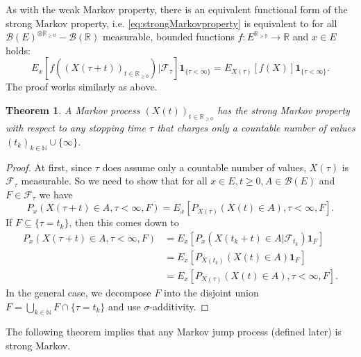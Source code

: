 \documentclass[12pt,a4paper]{scrartcl}
\newtheorem{theorem}{Theorem}[section]
\numberwithin{equation}{section}
\newcommand{\R}{\mathbb{R}} %
\newcommand{\N}{\mathbb{N}} %
\begin{document}
As with the weak Markov property, there is an equivalent functional form of the strong Markov property, i.e. \eqref{eq:strongMarkovproperty} is equivalent to for all $\mathcal{B}\left(E\right)^{\otimes \R_{\geq 0}}-\mathcal{B}\left(\R\right)$ measurable, bounded functions $f: E^{\R_{\geq 0}} \to \R$ and $x \in E$ holds:
\begin{equation}
E_x\left[f\left(\left(X\left(\tau + t\right)\right)_{t \in \R_{\geq 0}} \right) | \mathcal{F}_{\tau} \right] \textbf{1}_{\lbrace \tau < \infty \rbrace} = E_{X\left(\tau\right)}\left[f\left(X\right) \right] \textbf{1}_{\lbrace \tau < \infty \rbrace}.
\end{equation}
The proof works similarly as above.

\begin{theorem} \label{th:countablestoppingtime}
A Markov process $\left(X\left(t\right)\right)_{t \in \R_{\geq 0}}$ has the strong Markov property with respect to any stopping time $\tau$ that charges only a countable number of values $\left(t_k\right)_{k \in \N} \cup \lbrace \infty \rbrace$.
\end{theorem}
\begin{proof}
At first, since $\tau$ does assume only a countable number of values, $X\left(\tau\right)$ is $\mathcal{F}_{\tau}$ measurable. So we need to show that for all $x \in E, t \geq 0, A \in \mathcal{B}\left(E\right) $ and $F \in \mathcal{F}_{\tau}$ we have
$$ P_x\left(X\left(\tau+t\right) \in A, \tau < \infty, F \right) = E_x\left[P_{X\left(\tau\right)}\left(X\left(t\right) \in A \right), \tau < \infty, F \right]. $$
If $F \subseteq \lbrace \tau = t_k \rbrace $, then this comes down to
\begin{align*}
P_x\left(X\left(\tau+t\right) \in A, \tau < \infty, F \right) &= E_x\left[P_x\left(X\left(t_k + t \right) \in A |\mathcal{F}_{t_k} \right) \textbf{1}_F \right] \\ 
&= E_x\left[ P_{X\left(t_k\right)}\left( X\left(t\right) \in A \right) \textbf{1}_F \right] \\
&= E_x\left[P_{X\left(\tau\right)}\left(X\left(t\right) \in A \right), \tau < \infty, F \right].
\end{align*}
In the general case, we decompose $F$ into the disjoint union $F = \bigcup_{k \in \N} F \cap \lbrace \tau = t_k \rbrace $ and use $\sigma$-additivity.
\end{proof}

The following theorem implies that any Markov jump process (defined later) is strong Markov.
\end{document}
